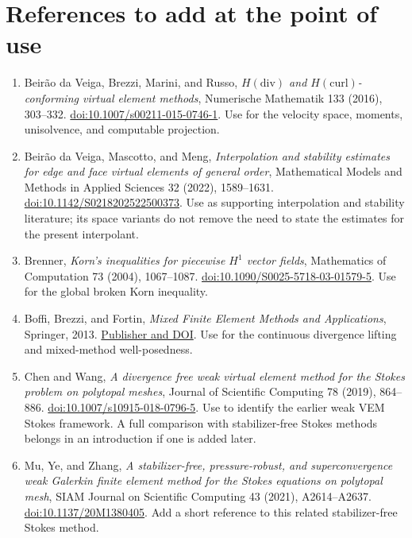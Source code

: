 \documentclass[10pt]{article}
\begin{document}
\section*{References to add at the point of use}
\begin{enumerate}
\item Beir\~ao da Veiga, Brezzi, Marini, and Russo,
\emph{$H(\mathrm{div})$ and $H(\mathrm{curl})$-conforming virtual element methods},
Numerische Mathematik 133 (2016), 303--332.
\href{https://doi.org/10.1007/s00211-015-0746-1}{doi:10.1007/s00211-015-0746-1}.
Use for the velocity space, moments, unisolvence, and computable projection.
\item Beir\~ao da Veiga, Mascotto, and Meng,
\emph{Interpolation and stability estimates for edge and face virtual elements
of general order}, Mathematical Models and Methods in Applied Sciences 32
(2022), 1589--1631.
\href{https://doi.org/10.1142/S0218202522500373}{doi:10.1142/S0218202522500373}.
Use as supporting interpolation and stability literature; its space variants
do not remove the need to state the estimates for the present interpolant.
\item Brenner, \emph{Korn's inequalities for piecewise $H^1$ vector fields},
Mathematics of Computation 73 (2004), 1067--1087.
\href{https://doi.org/10.1090/S0025-5718-03-01579-5}{doi:10.1090/S0025-5718-03-01579-5}.
Use for the global broken Korn inequality.
\item Boffi, Brezzi, and Fortin, \emph{Mixed Finite Element Methods and
Applications}, Springer, 2013.
\href{https://doi.org/10.1007/978-3-642-36519-5}{Publisher and DOI}.
Use for the continuous divergence lifting and mixed-method well-posedness.
\item Chen and Wang, \emph{A divergence free weak virtual element method for
the Stokes problem on polytopal meshes}, Journal of Scientific Computing 78
(2019), 864--886.
\href{https://doi.org/10.1007/s10915-018-0796-5}{doi:10.1007/s10915-018-0796-5}.
Use to identify the earlier weak VEM Stokes framework. A full comparison with stabilizer-free Stokes methods belongs in an
introduction if one is added later.
\item Mu, Ye, and Zhang, \emph{A stabilizer-free, pressure-robust, and
superconvergence weak Galerkin finite element method for the Stokes equations
on polytopal mesh}, SIAM Journal on Scientific Computing 43 (2021),
A2614--A2637.
\href{https://doi.org/10.1137/20M1380405}{doi:10.1137/20M1380405}.
Add a short reference to this related stabilizer-free Stokes method.

\end{enumerate}
\end{document}
